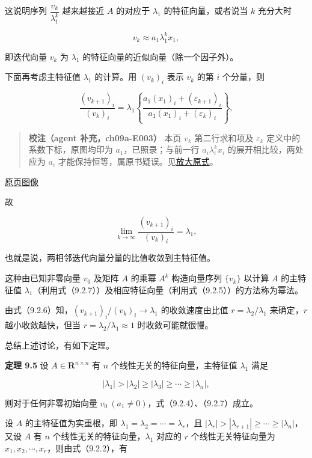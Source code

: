 \documentclass[
  10pt,
  fontset=fandol]{ctexart}
\begin{document}
这说明序列 \(\dfrac{v_k}{\lambda_1^k}\) 越来越接近 \(A\) 的对应于 \(\lambda_1\) 的特征向量，或者说当 \(k\) 充分大时

\[
v_k\approx a_1\lambda_1^kx_1,
\tag{9.2.5}
\]

即迭代向量 \(v_k\) 为 \(\lambda_1\) 的特征向量的近似向量（除一个因子外）。

下面再考虑主特征值 \(\lambda_1\) 的计算。用 \((v_k)_i\) 表示 \(v_k\) 的第 \(i\) 个分量，则

\[
\frac{(v_{k+1})_i}{(v_k)_i}=\lambda_1\left\{\frac{a_1(x_1)_i+(\varepsilon_{k+1})_i}{a_1(x_1)_i+(\varepsilon_k)_i}\right\},
\tag{9.2.6}
\]

\begin{quote}
\textbf{校注（agent 补充，ch09a-E003）} 本页 \(v_k\) 第二行求和项及 \(\varepsilon_k\) 定义中的系数下标，原图均印为 \(a_1\)，已照录；与前一行 \(a_i\lambda_i^kx_i\) 的展开相比较，两处应为 \(a_i\) 才能保持恒等，属原书疑误。见\href{../assets/ch09a/review-p235-power-expansion.png}{放大原式}。
\end{quote}

\href{../../source-images/pdf-236.jpeg}{原页图像}

故

\[
\lim_{k\to\infty}\frac{(v_{k+1})_i}{(v_k)_i}=\lambda_1,
\tag{9.2.7}
\]

也就是说，两相邻迭代向量分量的比值收敛到主特征值。

这种由已知非零向量 \(v_0\) 及矩阵 \(A\) 的乘幂 \(A^k\) 构造向量序列 \(\{v_k\}\) 以计算 \(A\) 的主特征值 \(\lambda_1\)（利用式（9.2.7））及相应特征向量（利用式（9.2.5））的方法称为幂法。

由式（9.2.6）知，\((v_{k+1})_i/(v_k)_i\to\lambda_1\) 的收敛速度由比值 \(r=\lambda_2/\lambda_1\) 来确定，\(r\) 越小收敛越快，但当 \(r=\lambda_2/\lambda_1\approx1\) 时收敛可能就很慢。

总结上述讨论，有如下定理。

\textbf{定理 9.5} 设 \(A\in\mathbf R^{n\times n}\) 有 \(n\) 个线性无关的特征向量，主特征值 \(\lambda_1\) 满足

\[
|\lambda_1|>|\lambda_2|\geq|\lambda_3|\geq\cdots\geq|\lambda_n|,
\]

则对于任何非零初始向量 \(v_0\ (a_1\ne0)\)，式（9.2.4）、（9.2.7）成立。

设 \(A\) 的主特征值为实重根，即 \(\lambda_1=\lambda_2=\cdots=\lambda_r\)，且 \(|\lambda_r|>|\lambda_{r+1}|\geq\cdots\geq|\lambda_n|\)，又设 \(A\) 有 \(n\) 个线性无关的特征向量，\(\lambda_1\) 对应的 \(r\) 个线性无关特征向量为 \(x_1,x_2,\cdots,x_r\)，则由式（9.2.2），有
\end{document}

